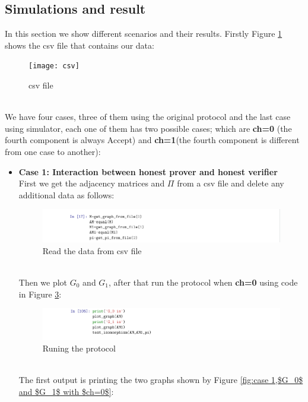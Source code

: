 \documentclass[12pt,a4paper]{article}
\begin{document}
\subsection{Simulations and result}
In this section we show different scenarios and their results. Firstly Figure \ref{fig:csv} shows the csv file that contains our data:
\begin{figure}[h]
	\centering
	\texttt{[image: csv]}
	\caption{csv file}
	\label{fig:csv}
\end{figure}\\
We have four cases,  three of them using the original protocol and the last case using simulator, each one of them has two possible cases; which are \textbf{ch=0} (the fourth component is always Accept) and \textbf{ch=1}(the fourth component is different from one case to another):
\begin{itemize}
\item \textbf{Case 1: Interaction between honest prover and honest verifier}\\
First we get the adjacency matrices and $\Pi$ from a csv file and delete any additional data as follows:\\
\begin{figure}[h]
	\centering
	\includegraphics[width=1.25\linewidth]{3-1}
	\caption{Read the data from csv file}
	\label{fig:3-1}
\end{figure}\\
Then we plot $G_0$ and $G_1$, after that run the protocol when \textbf{ch=0} using code in Figure \ref{fig:3-2}:
\begin{figure}[h]
	\centering
	\includegraphics[width=1.25\linewidth]{3-2}
	\caption{Runing the protocol}
	\label{fig:3-2}
\end{figure}\\
The first output is printing the two graphs shown by Figure  \ref{fig:case 1,$G_0$ and $G_1$ with $ch=0$}:\\
\begin{figure}[h!]
	\centering\begin{subfigure}[b]{.4\linewidth}

\end{subfigure}
\end{figure}
\end{itemize}
\end{document}
